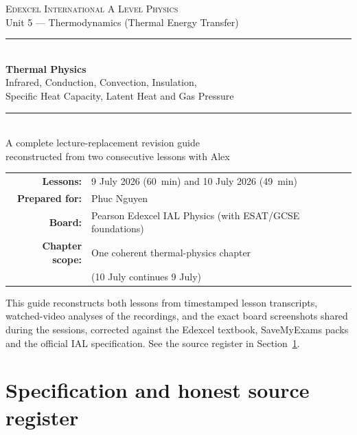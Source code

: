 \documentclass[11pt,a4paper]{article}
\begin{document}
\begin{titlepage}
\centering
\vspace*{1.2cm}
{\Large\scshape Edexcel International A Level Physics}\\[0.4cm]
{\large Unit 5 --- Thermodynamics (Thermal Energy Transfer)}\\[1.6cm]
\rule{\textwidth}{1.1pt}\\[0.5cm]
{\huge\bfseries Thermal Physics}\\[0.35cm]
{\Large Infrared, Conduction, Convection, Insulation,\\[0.15cm]
Specific Heat Capacity, Latent Heat and Gas Pressure}\\[0.5cm]
\rule{\textwidth}{1.1pt}\\[1.6cm]

{\large A complete lecture-replacement revision guide}\\[0.3cm]
{\large reconstructed from two consecutive lessons with Alex}\\[1.2cm]

\begin{tabular}{rl}
\textbf{Lessons:} & 9 July 2026 (\SI{60}{min}) and 10 July 2026 (\SI{49}{min})\\[4pt]
\textbf{Prepared for:} & Phuc Nguyen\\[4pt]
\textbf{Board:} & Pearson Edexcel IAL Physics (with ESAT/GCSE foundations)\\[4pt]
\textbf{Chapter scope:} & One coherent thermal-physics chapter\\
 & (10 July continues 9 July)\\
\end{tabular}

\vfill
{\small This guide reconstructs both lessons from timestamped lesson transcripts,
watched-video analyses of the recordings, and the exact board screenshots shared during
the sessions, corrected against the Edexcel textbook, SaveMyExams packs and the official
IAL specification. See the source register in Section~\ref{sec:sources}.}
\vspace{1cm}
\end{titlepage}

\tableofcontents
\thispagestyle{fancy}
\clearpage

\section{Specification and honest source register}
\label{sec:sources}
\end{document}
